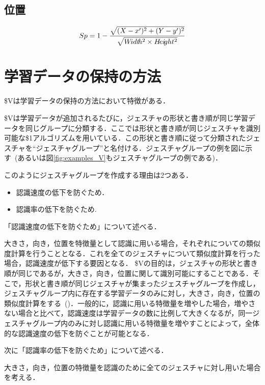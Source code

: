 

\subsection{位置}
\begin{equation}
S{\scriptsize p} = 1 - \frac{\sqrt{(X - x')^2 + (Y - y')^2}}{\sqrt{W\!idt\!h^2 \times H\!ei\!ght^2}}
\end{equation}


\section{学習データの保持の方法}
\$Vは学習データの保持の方法において特徴がある．

\$Vは学習データが追加されるたびに，ジェスチャの形状と書き順が同じ学習データを同じグループに分類する．ここでは形状と書き順が同じジェスチャを識別可能な\$1アルゴリズムを用いている．この形状と書き順に従って分類されたジェスチャを``ジェスチャグループ''と名付ける．ジェスチャグループの例を図に示す~(あるいは図\ref{fig:examples_V}もジェスチャグループの例である)．

このようにジェスチャグループを作成する理由は2つある．
\begin{itemize}
\item 認識速度の低下を防ぐため．
\item 認識率の低下を防ぐため.
\end{itemize}

「認識速度の低下を防ぐため」について述べる．

大きさ，向き，位置を特徴量として認識に用いる場合，それぞれについての類似度計算を行うこととなる．これを全てのジェスチャについて類似度計算を行った場合，認識速度が低下する要因となる．
\$Vの目的は，ジェスチャの形状と書き順が同じであるが，大きさ，向き，位置に関して識別可能にすることである．そこで，形状と書き順が同じジェスチャが集まったジェスチャグループを作成し，ジェスチャグループ内に存在する学習データのみに対し，大きさ，向き，位置の類似度計算をする~()．一般的に，認識に用いる特徴量を増やした場合，増やさない場合と比べて，認識速度は学習データの数に比例して大きくなるが，同一ジェスチャグループ内のみに対し認識に用いる特徴量を増やすことによって，全体的な認識速度の低下を防ぐことが可能となる．

次に「認識率の低下を防ぐため」について述べる．

大きさ，向き，位置の特徴量を認識のために全てのジェスチャに対し用いた場合を考える．

